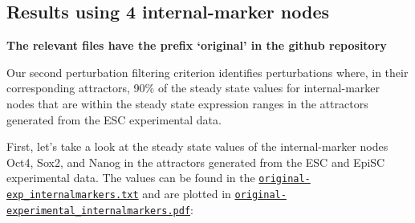 \documentclass[
]{book}
\begin{document}
\hypertarget{results-using-4-internal-marker-nodes}{%
\subsection{Results using 4 internal-marker nodes}\label{results-using-4-internal-marker-nodes}}

\textbf{The relevant files have the prefix `original' in the github repository}

Our second perturbation filtering criterion identifies perturbations where, in their corresponding attractors, 90\% of the steady state values for internal-marker nodes that are within the steady state expression ranges in the attractors generated from the ESC experimental data.

First, let's take a look at the steady state values of the internal-marker nodes Oct4, Sox2, and Nanog in the attractors generated from the ESC and EpiSC experimental data. The values can be found in the \href{https://github.com/VeraLiconaResearchGroup/Netisce/blob/main/ipsc_validation/results/original-exp_internalmarkers.txt}{\texttt{original-exp\_internalmarkers.txt}} and are plotted in \href{https://github.com/VeraLiconaResearchGroup/Netisce/blob/main/ipsc_validation/results/original-experimental_internalmarkers.pdf}{\texttt{original-experimental\_internalmarkers.pdf}}:
\end{document}
